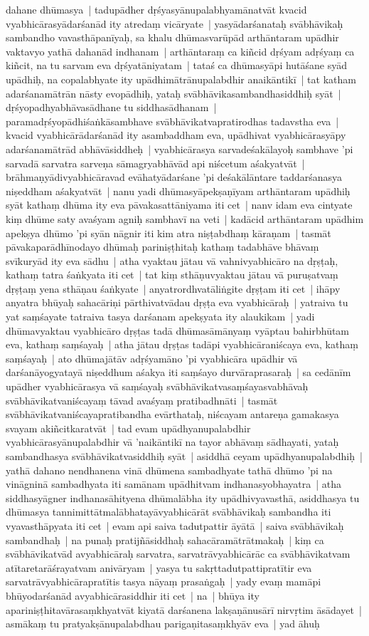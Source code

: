 \documentclass[article,12pt,a4paper]{memoir}
\begin{document}
dahane dhūmasya | tadupādher dṛśyasyānupalabhyamānatvāt kvacid vyabhicārasyādarśanād ity atredaṃ vicāryate | yasyādarśanataḥ svābhāvikaḥ sambandho vavasthāpanīyaḥ, sa khalu dhūmasvarūpād arthāntaram upādhir vaktavyo yathā dahanād indhanam | arthāntaraṃ ca kiñcid dṛśyam adṛśyaṃ ca kiñcit, na tu sarvam eva dṛśyatāniyatam | tataś ca dhūmasyāpi hutāśane syād upādhiḥ, na copalabhyate ity upādhimātrānupalabdhir anaikāntikī | tat katham adarśanamātrān nāsty evopādhiḥ, yataḥ svābhāvikasambandhasiddhiḥ syāt | dṛśyopadhyabhāvasādhane tu siddhasādhanam | paramadṛśyopādhiśaṅkāsambhave svābhāvikatvapratirodhas tadavstha eva | kvacid vyabhicārādarśanād ity asambaddham eva, upādhivat vyabhicārasyāpy adarśanamātrād abhāvāsiddheḥ | vyabhicārasya sarvadeśakālayoḥ sambhave 'pi sarvadā sarvatra sarveṇa sāmagryabhāvād api niścetum aśakyatvāt | brāhmaṇyādivyabhicāravad evāhatyādarśane 'pi deśakālāntare taddarśanasya niṣeddham aśakyatvāt | \label{thakur75-110.7} nanu yadi dhūmasyāpekṣaṇīyam arthāntaram upādhiḥ syāt kathaṃ dhūma ity eva pāvakasattāniyama iti cet | nanv idam eva cintyate kiṃ dhūme saty avaśyam agniḥ sambhavī na veti | kadācid arthāntaram upādhim apekṣya dhūmo 'pi syān nāgnir iti kim atra niṣṭabdhaṃ kāraṇam | tasmāt pāvakaparādhīnodayo dhūmaḥ pariniṣṭhitaḥ kathaṃ tadabhāve bhāvaṃ svīkuryād ity eva sādhu | \label{thakur75-110.12} atha vyaktau jātau vā vahnivyabhicāro na dṛṣṭaḥ, kathaṃ tatra śaṅkyata iti cet | tat kiṃ sthāṇuvyaktau jātau vā puruṣatvaṃ dṛṣṭaṃ yena sthāṇau śaṅkyate | anyatrordhvatāliṅgite dṛṣṭam iti cet | ihāpy anyatra bhūyaḥ sahacāriṇi pārthivatvādau dṛṣṭa eva vyabhicāraḥ | yatraiva tu yat saṃśayate tatraiva tasya darśanam apekṣyata ity alaukikam | yadi dhūmavyaktau vyabhicāro dṛṣṭas tadā dhūmasāmānyaṃ vyāptau bahirbhūtam eva, kathaṃ saṃśayaḥ | atha jātau dṛṣṭas tadāpi vyabhicāraniścaya eva, kathaṃ saṃśayaḥ | ato dhūmajātāv adṛśyamāno 'pi vyabhicāra upādhir vā darśanāyogyatayā niṣeddhum aśakya iti saṃśayo durvāraprasaraḥ | sa cedānīm upādher vyabhicārasya vā saṃśayaḥ svābhāvikatvasaṃśayasvabhāvaḥ svābhāvikatvaniścayaṃ tāvad avaśyaṃ pratibadhnāti | tasmāt svābhāvikatvaniścayapratibandha evārthataḥ, niścayam antareṇa gamakasya svayam akiñcitkaratvāt | tad evam upādhyanupalabdhir vyabhicārasyānupalabdhir vā 'naikāntikī na tayor abhāvaṃ sādhayati, yataḥ sambandhasya svābhāvikatvasiddhiḥ syāt | asiddhā ceyam upādhyanupalabdhiḥ | yathā dahano nendhanena vinā dhūmena sambadhyate tathā dhūmo 'pi na vināgninā sambadhyata iti samānam upādhitvam indhanasyobhayatra | \label{thakur75-110.26} atha siddhasyāgner indhanasāhityena dhūmalābha ity upādhivyavasthā, asiddhasya tu dhūmasya tannimittātmalābhatayāvyabhicārāt svābhāvikaḥ sambandha iti vyavasthāpyata iti cet | evam api saiva tadutpattir āyātā | saiva svābhāvikaḥ sambandhaḥ | na punaḥ pratijñāsiddhaḥ sahacāramātrātmakaḥ | kiṃ ca svābhāvikatvād avyabhicāraḥ sarvatra, sarvatrāvyabhicārāc ca svābhāvikatvam atītaretarāśrayatvam anivāryam | yasya tu sakṛttadutpattipratītir eva sarvatrāvyabhicārapratītis tasya nāyaṃ prasaṅgaḥ | \label{thakur75-110.32} yady evaṃ mamāpi bhūyodarśanād avyabhicārasiddhir iti cet | na | bhūya ity apariniṣṭhitavārasaṃkhyatvāt kiyatā darśanena lakṣaṇānusārī nirvṛtim āsādayet | asmākaṃ tu pratyakṣānupalabdhau parigaṇitasaṃkhyāv eva | yad āhuḥ
\end{document}
